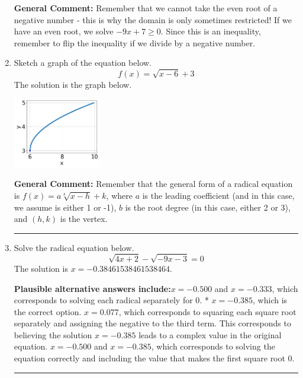 \documentclass{extbook}[14pt]
\newcommand{\litem}[1]{\item #1

\rule{\textwidth}{0.4pt}}
\begin{document}
\begin{enumerate}
{\textbf{General Comment:} Remember that we cannot take the even root of a negative number - this is why the domain is only sometimes restricted! If we have an even root, we solve $-9 x + 7 \geq 0$. Since this is an inequality, remember to flip the inequality if we divide by a negative number.
}
\litem{
Sketch a graph of the equation below.
\[ f(x) = \sqrt{x - 6} + 3 \]The solution is the graph below.
    \begin{center}
        \includegraphics[width=0.3\textwidth]{../Figures/radicalEquationToGraphCA.png}
    \end{center}

\textbf{General Comment:} Remember that the general form of a radical equation is $ f(x) = a \sqrt[b]{x - h} + k $, where $a$ is the leading coefficient (and in this case, we assume is either 1 or -1), $b$ is the root degree (in this case, either 2 or 3), and $(h, k)$ is the vertex.
}
\litem{
Solve the radical equation below.
\[ \sqrt{4 x + 2} - \sqrt{-9 x - 3} = 0 \]The solution is \( x = -0.38461538461538464 \).\begin{enumerate}[label=\Alph*.]
\textbf{Plausible alternative answers include:}$x = -0.500$ and $x = -0.333$, which corresponds to solving each radical separately for 0.
* $x = -0.385$, which is the correct option.
$x = 0.077$, which corresponds to squaring each square root separately and assigning the negative to the third term.
This corresponds to believing the solution $x = -0.385$ leads to a complex value in the original equation.
$x = -0.500$ and $x = -0.385$, which corresponds to solving the equation correctly and including the value that makes the first square root 0.
\end{enumerate}

}
\end{enumerate}
\end{document}
